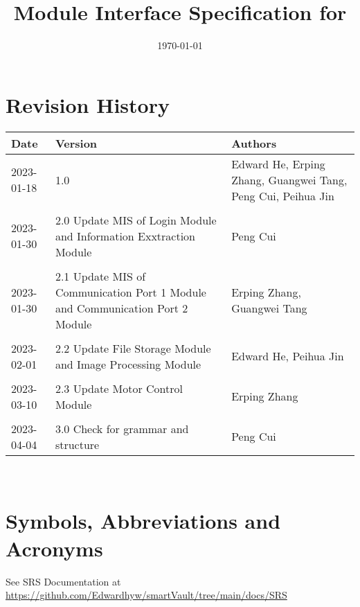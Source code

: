 \documentclass[12pt, titlepage]{article}
\begin{document}
\title{Module Interface Specification for \progname{}}

\author{\authname}

\date{\today}

\maketitle


\section{Revision History}

\begin{tabularx}{\textwidth}{p{2cm}p{6cm}X}
\toprule {\bf Date} & {\bf Version} & {\bf Authors}\\
\midrule
2023-01-18 & 1.0 & Edward He, Erping Zhang, Guangwei Tang, Peng Cui, Peihua Jin\\\\
2023-01-30 & 2.0 Update MIS of Login Module and Information Exxtraction Module & Peng Cui\\\\

2023-01-30 & 2.1 Update MIS of Communication Port 1 Module and Communication Port 2 Module & Erping Zhang, Guangwei Tang\\\\

2023-02-01 & 2.2 Update File Storage Module and Image Processing Module & Edward He, Peihua Jin\\\\

2023-03-10 & 2.3 Update Motor Control Module & Erping Zhang\\\\

2023-04-04 & 3.0 Check for grammar and structure & Peng Cui\\
\bottomrule
\end{tabularx}

~\newpage

\section{Symbols, Abbreviations and Acronyms}

See SRS Documentation at \url{https://github.com/Edwardhyw/smartVault/tree/main/docs/SRS}


\newpage
\end{document}
